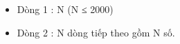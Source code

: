 \begin{itemize}
	\item Dòng 1 : N (N ≤ 2000)
	\item Dòng 2 : N dòng tiếp theo gồm N số.
\end{itemize}

\